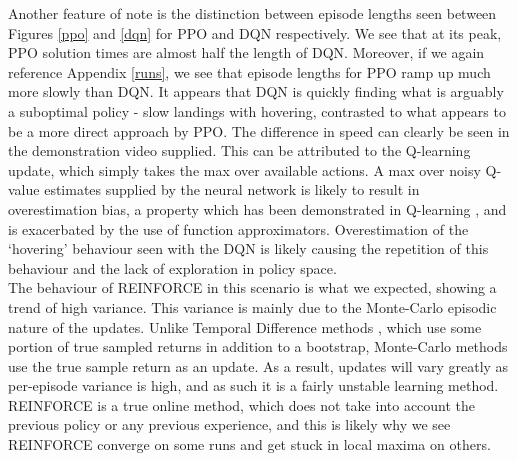 \documentclass{article}
\begin{document}
Another feature of note is the distinction between episode lengths seen between Figures \ref{ppo} and \ref{dqn} for PPO and DQN respectively. We see that at its peak, PPO solution times are almost half the length of DQN. Moreover, if we again reference Appendix \ref{runs}, we see that episode lengths for PPO ramp up much more slowly than DQN. It appears that DQN is quickly finding what is arguably a suboptimal policy - slow landings with hovering, contrasted to what appears to be a more direct approach by PPO. The difference in speed can clearly be seen in the demonstration video supplied. This can be attributed to the Q-learning update, which simply takes the max over available actions. A max over noisy Q-value estimates supplied by the neural network is likely to result in overestimation bias, a property which has been demonstrated in Q-learning \citep{thrun1993issues,hasselt2010double}, and is exacerbated by the use of function approximators. Overestimation of the `hovering' behaviour seen with the DQN is likely causing the repetition of this behaviour and the lack of exploration in policy space.\\\newline
The behaviour of REINFORCE in this scenario is what we expected, showing a trend of high variance. This variance is mainly due to the Monte-Carlo episodic nature of the updates. Unlike Temporal Difference methods \citep{tesauro1995temporal}, which use some portion of true sampled returns in addition to a bootstrap, Monte-Carlo methods use the true sample return as an update. As a result, updates will vary greatly as per-episode variance is high, and as such it is a fairly unstable learning method. REINFORCE is a true online method, which does not take into account the previous policy or any previous experience, and this is likely why we see REINFORCE converge on some runs and get stuck in local maxima on others.  
\end{document}

